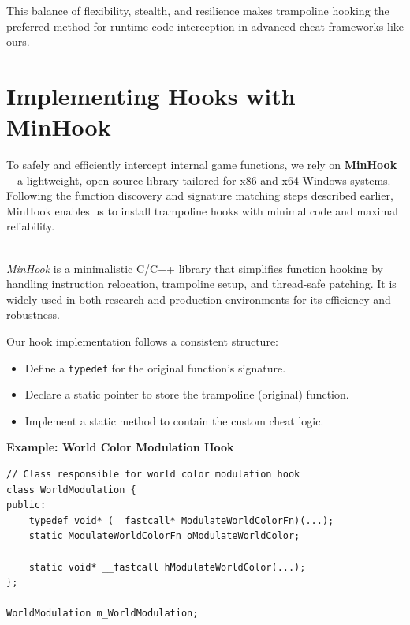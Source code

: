 This balance of flexibility, stealth, and resilience makes trampoline hooking the preferred method for runtime code interception in advanced cheat frameworks like ours.

\section{Implementing Hooks with MinHook}

To safely and efficiently intercept internal game functions, we rely on \textbf{MinHook}—a lightweight, open-source library tailored for x86 and x64 Windows systems.  
Following the function discovery and signature matching steps described earlier, MinHook enables us to install trampoline hooks with minimal code and maximal reliability.

\begin{tcolorbox}[colback=gray!10, colframe=gray!50, boxrule=0pt, sharp corners, width=\linewidth, left=1mm, right=1mm, top=0.5mm, bottom=0.5mm]
 \\
\textit{MinHook} is a minimalistic C/C++ library that simplifies function hooking by handling instruction relocation, trampoline setup, and thread-safe patching. It is widely used in both research and production environments for its efficiency and robustness.
\end{tcolorbox}

Our hook implementation follows a consistent structure:

\begin{itemize}
    \item Define a \texttt{typedef} for the original function’s signature.
    \item Declare a static pointer to store the trampoline (original) function.
    \item Implement a static method to contain the custom cheat logic.
\end{itemize}

\textbf{Example: World Color Modulation Hook}

\begin{lstlisting}[style=cppstyle]
// Class responsible for world color modulation hook
class WorldModulation {
public:
    typedef void* (__fastcall* ModulateWorldColorFn)(...);
    static ModulateWorldColorFn oModulateWorldColor;

    static void* __fastcall hModulateWorldColor(...);
};

WorldModulation m_WorldModulation;
\end{lstlisting}

